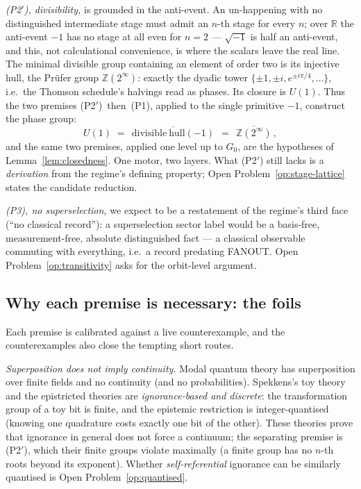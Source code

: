 \emph{(P2$'$), divisibility,} is grounded in the anti-event. An un-happening with no
distinguished intermediate stage must admit an $n$-th stage for every $n$; over
$\mathbb{R}$ the anti-event $-1$ has no stage at all even for $n = 2$ --- $\sqrt{-1}$ is
half an anti-event, and this, not calculational convenience, is where the scalars leave
the real line. The minimal divisible group containing an element of order two is its
injective hull, the Pr\"ufer group $\mathbb{Z}(2^{\infty})$: exactly the dyadic tower
$\{\pm 1, \pm i, e^{\pm i\pi/4}, \dots\}$, i.e.\ the Thomson schedule's halvings read as
phases. Its closure is $U(1)$. Thus the two premises (P2$'$)~then~(P1), applied to the
single primitive $-1$, construct the phase group:
\begin{equation}
U(1) \;=\; \overline{\,\mathrm{divisible\ hull}(-1)\,}
\;=\; \overline{\,\mathbb{Z}(2^{\infty})\,},
\label{eq:dyadic-tower}
\end{equation}
and the same two premises, applied one level up to $G_0$, are the hypotheses of
Lemma~\ref{lem:closedness}. One motor, two layers. What (P2$'$) still lacks is a
\emph{derivation} from the regime's defining property; Open Problem~\ref{op:stage-lattice}
states the candidate reduction.

\emph{(P3), no superselection,} we expect to be a restatement of the regime's third face
(``no classical record''): a superselection sector label would be a basis-free,
measurement-free, absolute distinguished fact --- a classical observable commuting with
everything, i.e.\ a record predating FANOUT. Open Problem~\ref{op:transitivity} asks for
the orbit-level argument.

\subsection{Why each premise is necessary: the foils}
\label{app:cont-deadroutes}

Each premise is calibrated against a live counterexample, and the counterexamples also
close the tempting short routes.

\emph{Superposition does not imply continuity.} Modal quantum theory
\cite{schumacherwestmoreland2012} has superposition over finite fields and no continuity
(and no probabilities). Spekkens's toy theory and the epistricted theories
\cite{spekkens2007, spekkens2016} are \emph{ignorance-based and discrete}: the
transformation group of a toy bit is finite, and the epistemic restriction is
integer-quantised (knowing one quadrature costs exactly one bit of the other). These
theories prove that ignorance in general does not force a continuum; the separating
premise is (P2$'$), which their finite groups violate maximally (a finite group has no
$n$-th roots beyond its exponent). Whether \emph{self-referential} ignorance can be
similarly quantised is Open Problem~\ref{op:quantised}.

